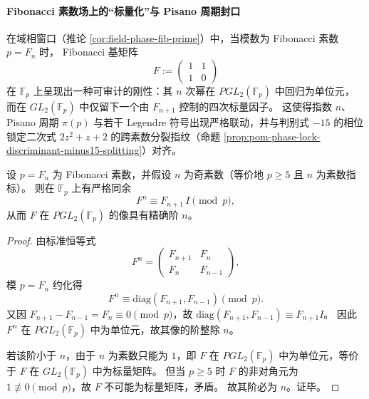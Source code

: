 
\paragraph{Fibonacci 素数场上的“标量化”与 Pisano 周期封口}\label{par:gut-fibprime-pgl2-pisano}
在域相窗口（推论 \ref{cor:field-phase-fib-prime}）中，当模数为 Fibonacci 素数 \(p=F_n\) 时，
Fibonacci 基矩阵
\[
F:=\begin{pmatrix}1&1\\[2pt]1&0\end{pmatrix}
\]
在 \(\mathbb{F}_p\) 上呈现出一种可审计的刚性：其 \(n\) 次幂在 \(PGL_2(\mathbb{F}_p)\) 中回归为单位元，
而在 \(GL_2(\mathbb{F}_p)\) 中仅留下一个由 \(F_{n+1}\) 控制的四次标量因子。
这使得指数 \(n\)、Pisano 周期 \(\pi(p)\) 与若干 Legendre 符号出现严格联动，并与判别式 \(-15\) 的相位锁定二次式
\(2z^2+z+2\) 的跨素数分裂指纹（命题 \ref{prop:pom-phase-lock-discriminant-minus15-splitting}）对齐。

\begin{proposition}\label{prop:gut-fibprime-pgl2-order-n}
设 \(p=F_n\) 为 Fibonacci 素数，并假设 \(n\) 为奇素数（等价地 \(p\ge 5\) 且 \(n\) 为素数指标）。
则在 \(\mathbb{F}_p\) 上有严格同余
\[
F^n\equiv F_{n+1}\,I\pmod p,
\]
从而 \(F\) 在 \(PGL_2(\mathbb{F}_p)\) 的像具有精确阶 \(n\)。
\end{proposition}
\begin{proof}
由标准恒等式
\[
F^n=
\begin{pmatrix}
F_{n+1} & F_n\\
F_n & F_{n-1}
\end{pmatrix},
\]
模 \(p=F_n\) 约化得
\[
F^n\equiv
\mathrm{diag}(F_{n+1},F_{n-1})
\pmod p.
\]
又因 \(F_{n+1}-F_{n-1}=F_n\equiv 0\pmod p\)，故 \(\mathrm{diag}(F_{n+1},F_{n-1})\equiv F_{n+1}I\)。
因此 \(F^n\) 在 \(PGL_2(\mathbb{F}_p)\) 中为单位元，故其像的阶整除 \(n\)。
\par
若该阶小于 \(n\)，由于 \(n\) 为素数只能为 \(1\)，即 \(F\) 在 \(PGL_2(\mathbb{F}_p)\) 中为单位元，等价于 \(F\) 在 \(GL_2(\mathbb{F}_p)\) 中为标量矩阵。
但当 \(p\ge 5\) 时 \(F\) 的非对角元为 \(1\not\equiv 0\pmod p\)，故 \(F\) 不可能为标量矩阵，矛盾。
故其阶必为 \(n\)。证毕。
\end{proof}

